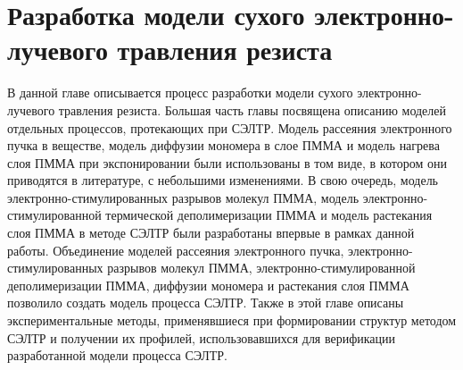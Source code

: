 \chapter{Разработка модели сухого электронно-лучевого травления резиста}

В данной главе описывается процесс разработки модели сухого электронно-лучевого травления резиста. Большая часть главы посвящена описанию моделей отдельных процессов, протекающих при СЭЛТР.
Модель рассеяния электронного пучка в веществе, модель диффузии мономера в слое ПММА и модель нагрева слоя ПММА при экспонировании были использованы в том виде, в котором они приводятся в литературе, с небольшими изменениями.
В свою очередь, модель электронно-стимулированных разрывов молекул ПММА, модель электронно-стимулированной термической деполимеризации ПММА и модель растекания слоя ПММА в методе СЭЛТР были разработаны впервые в рамках данной работы.
Объединение моделей рассеяния электронного пучка, электронно-стимулированных разрывов молекул ПММА, электронно-стимулированной деполимеризации ПММА, диффузии мономера и растекания слоя ПММА позволило создать модель процесса СЭЛТР.
Также в этой главе описаны экспериментальные методы, применявшиеся при формировании структур методом СЭЛТР и получении их профилей, использовавшихся для верификации разработанной модели процесса СЭЛТР.








